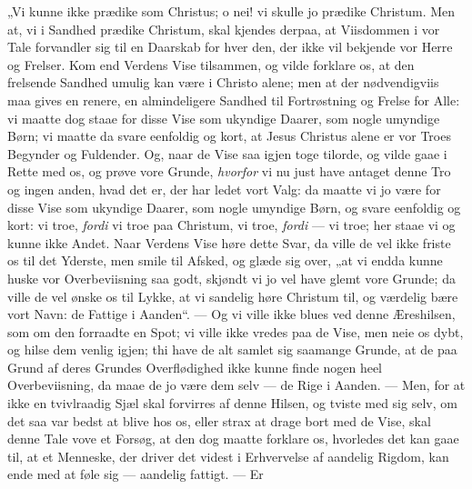 \documentclass[12pt,a4paper]{book}
\begin{document}
„Vi kunne ikke prædike som Christus; o nei! vi skulle jo prædike Christum. Men at, vi i
Sandhed prædike Christum, skal kjendes derpaa, at Viisdommen i vor Tale forvandler sig til
en
Daarskab for hver den, der ikke vil bekjende vor Herre og Frelser. Kom end Verdens Vise
tilsammen, og vilde forklare os, at den frelsende Sandhed umulig kan være i Christo alene;
men at der nødvendigviis maa gives en renere, en almindeligere Sandhed til Fortrøstning og
Frelse for Alle: vi maatte dog staae for disse Vise som ukyndige Daarer, som nogle umyndige
Børn; vi maatte da svare eenfoldig og kort, at Jesus Christus alene er vor Troes Begynder
og Fuldender. Og, naar de Vise saa igjen toge tilorde, og vilde gaae i Rette med os, og
prøve vore Grunde, \emph{hvorfor} vi nu just have antaget denne Tro og ingen anden, hvad
det er, der har ledet vort Valg: da maatte vi jo være for disse Vise som ukyndige Daarer,
som nogle umyndige Børn, og svare eenfoldig og kort: vi troe, \emph{fordi} vi troe paa
Christum, vi troe, \emph{fordi} --- vi troe; her staae vi og kunne ikke Andet. Naar Verdens
Vise høre dette Svar, da ville de vel ikke friste os til det Yderste, men smile til Afsked,
og glæde sig over, „at vi endda kunne huske vor Overbeviisning saa godt, skjøndt vi jo vel
have glemt vore Grunde; da ville de vel ønske os til Lykke, at vi sandelig høre Christum
til, og værdelig bære vort Navn: de Fattige i Aanden“. --- Og vi ville ikke blues ved denne
Æreshilsen, som om den forraadte en Spot; vi ville ikke vredes paa de Vise, men neie os
dybt, og hilse dem venlig igjen; thi have de alt samlet sig saamange Grunde, at de paa
Grund af deres Grundes Overflødighed ikke kunne finde nogen heel Overbeviisning, da maae de
jo være dem selv --- de Rige i Aanden. --- Men, for at ikke en tvivlraadig Sjæl skal
forvirres af denne Hilsen, og tviste med sig selv, om det saa var bedst at blive hos os,
eller strax at drage bort med de Vise, skal denne Tale vove et Forsøg, at den dog maatte
forklare os, hvorledes det kan gaae til, at et Menneske, der driver det videst i
Erhvervelse af aandelig Rigdom, kan ende med at føle sig --- aandelig fattigt. --- Er
\end{document}
